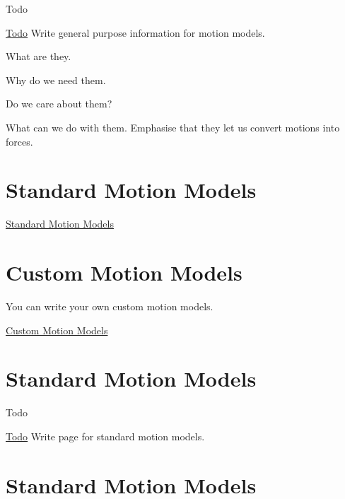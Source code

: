 \begin{DoxyRefDesc}{Todo}
\item[\hyperlink{todo__todo000008}{Todo}]Write general purpose information for motion models.
\begin{DoxyItemize}
\item What are they.
\item Why do we need them.
\item Do we care about them?
\item What can we do with them. Emphasise that they let us convert motions into forces.
\end{DoxyItemize}\end{DoxyRefDesc}


\section*{Standard Motion Models}

\hyperlink{standard_motion_models}{Standard Motion Models}

\section*{Custom Motion Models}

You can write your own custom motion models.

\hyperlink{custom_motion_models}{Custom Motion Models} \hypertarget{standard_motion_models}{}\section{Standard Motion Models}\label{standard_motion_models}
\begin{DoxyRefDesc}{Todo}
\item[\hyperlink{todo__todo000007}{Todo}]Write page for standard motion models.\end{DoxyRefDesc}


\section*{Standard Motion Models}

